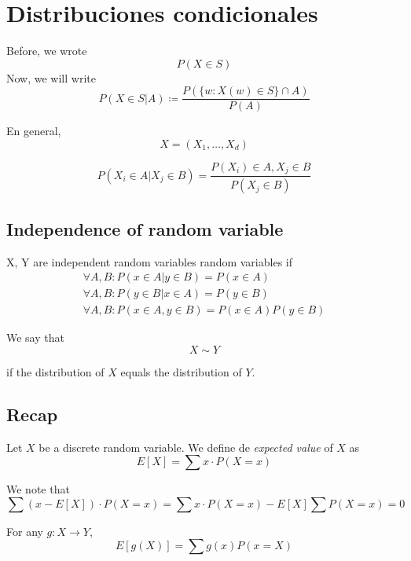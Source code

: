 \documentclass{article}
\theoremstyle{problemstyle}
\begin{document}
	
\section{Distribuciones condicionales}\label{sec:distribuciones_condicionales} %
 Before, we wrote
 \[
  P(X\in S)
 \]
 Now, we will write 
 \[
   P(X\in S|A) \coloneqq \frac{P(\{w:X(w)\in S\}\cap A)}{P(A)}
 \]

En general, 
\[
  X=(X_1, \dots, X_d)
\]

\[
  P(X_i\in A | X_j \in B) = \displaystyle\frac{P(X_i)\in A, X_j \in B}{P(X_j \in B)}
\]

\subsection{Independence of random variable}

X, Y are independent random variables random variables if 
\begin{align*}
  \forall A,B: P(x\in A|y\in B) = P(x\in A)\\
  \forall A,B: P(y\in B|x\in A) = P(y\in B)\\
  \forall A,B: P(x\in A,y\in B) = P(x\in A)P(y\in B)
\end{align*}


\begin{definition}
  We say that 
  \begin{displaymath}
    X \sim Y
  \end{displaymath}
  
  if the distribution of $ X $ equals the distribution of $ Y $.
\end{definition}

\subsection{Recap}

\begin{definition}
  Let $ X $ be a discrete random variable. We define de \textit{expected value} of $ X $ as
  \begin{displaymath}
    E[X] = \sum x \cdot P(X=x)
  \end{displaymath}
  
\end{definition}
We note that
\[
  \sum (x-E[X])\cdot P(X=x) = \sum x\cdot P(X = x) - E[X]\sum P(X=x) = 0
\]

\begin{definition}
  For any $ g:X \to Y$,
  \begin{displaymath}
    E[g(X)] = \sum g(x)P(x=X)
  \end{displaymath}
  
\end{definition}
\end{document}
